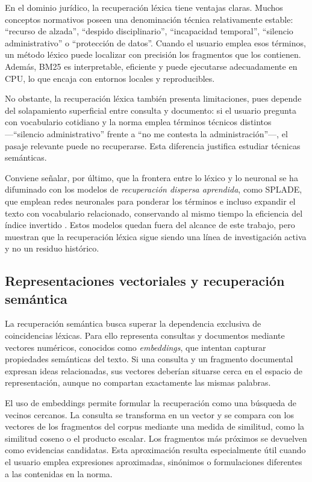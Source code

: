 En el dominio jurídico, la recuperación léxica tiene ventajas claras. Muchos conceptos normativos poseen una denominación técnica relativamente estable: ``recurso de alzada'', ``despido disciplinario'', ``incapacidad temporal'', ``silencio administrativo'' o ``protección de datos''. Cuando el usuario emplea esos términos, un método léxico puede localizar con precisión los fragmentos que los contienen. Además, BM25 es interpretable, eficiente y puede ejecutarse adecuadamente en CPU, lo que encaja con entornos locales y reproducibles.

No obstante, la recuperación léxica también presenta limitaciones, pues depende del solapamiento superficial entre consulta y documento: si el usuario pregunta con vocabulario cotidiano y la norma emplea términos técnicos distintos —``silencio administrativo'' frente a ``no me contesta la administración''—, el pasaje relevante puede no recuperarse. Esta diferencia justifica estudiar técnicas semánticas.

Conviene señalar, por último, que la frontera entre lo léxico y lo neuronal se ha difuminado con los modelos de \emph{recuperación dispersa aprendida}, como SPLADE, que emplean redes neuronales para ponderar los términos e incluso expandir el texto con vocabulario relacionado, conservando al mismo tiempo la eficiencia del índice invertido \cite{formal2021splade}. Estos modelos quedan fuera del alcance de este trabajo, pero muestran que la recuperación léxica sigue siendo una línea de investigación activa y no un residuo histórico.

\subsection{Representaciones vectoriales y recuperación semántica}
\label{sec:recuperacion-semantica}

La recuperación semántica busca superar la dependencia exclusiva de coincidencias léxicas. Para ello representa consultas y documentos mediante vectores numéricos, conocidos como \emph{embeddings}, que intentan capturar propiedades semánticas del texto. Si una consulta y un fragmento documental expresan ideas relacionadas, sus vectores deberían situarse cerca en el espacio de representación, aunque no compartan exactamente las mismas palabras.

El uso de embeddings permite formular la recuperación como una búsqueda de vecinos cercanos. La consulta se transforma en un vector y se compara con los vectores de los fragmentos del corpus mediante una medida de similitud, como la similitud coseno o el producto escalar. Los fragmentos más próximos se devuelven como evidencias candidatas. Esta aproximación resulta especialmente útil cuando el usuario emplea expresiones aproximadas, sinónimos o formulaciones diferentes a las contenidas en la norma.

